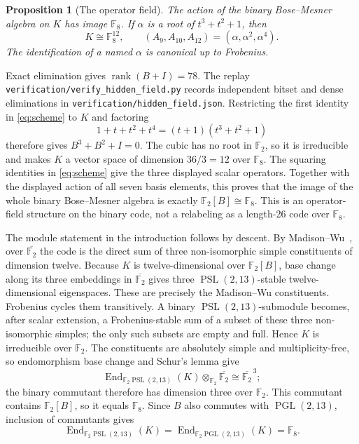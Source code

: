 \documentclass[11pt]{article}
\newtheorem{proposition}[theorem]{Proposition}
\theoremstyle{definition}
\theoremstyle{remark}
\newcommand{\F}{\mathbb F}
\begin{document}
\begin{proposition}[The operator field]
\label{prop:hidden-field}
The action of the binary Bose--Mesner algebra on \(K\) has image \(\F_8\).
If \(\alpha\) is a root of \(t^3+t^2+1\), then
\[
 K\cong\F_8^{12},\qquad
 (A_9,A_{10},A_{12})=(\alpha,\alpha^2,\alpha^4).
\]
The identification of a named \(\alpha\) is canonical up to Frobenius.
\end{proposition}

Exact elimination gives \(\operatorname{rank}(B+I)=78\).  The replay
\nolinkurl{verification/verify_hidden_field.py} records independent bitset and
dense eliminations in \nolinkurl{verification/hidden_field.json}.  Restricting
the first identity in \eqref{eq:scheme} to \(K\) and factoring
\[
 1+t+t^2+t^4=(t+1)(t^3+t^2+1)
\]
therefore gives \(B^3+B^2+I=0\).  The cubic has no root in \(\F_2\), so it
is irreducible and makes \(K\) a vector space of dimension \(36/3=12\) over
\(\F_8\).  The squaring identities in \eqref{eq:scheme} give the three
displayed scalar operators.  Together with the displayed action of all seven
basis elements, this proves that the image of the whole binary Bose--Mesner
algebra is exactly \(\F_2[B]\cong\F_8\).  This is an operator-field structure
on the binary code, not a relabeling as a length-26 code over \(\F_8\).

The module statement in the introduction follows by descent.  By
Madison--Wu~\cite[Theorem~5.1(i)]{MadisonWu2012}, over
\(\overline{\F_2}\) the code is the direct sum of three non-isomorphic simple
constituents of dimension twelve.  Because \(K\) is twelve-dimensional over
\(\F_2[B]\), base change along its three embeddings in \(\overline{\F_2}\)
gives three \(\operatorname{PSL}(2,13)\)-stable twelve-dimensional
eigenspaces.  These are precisely the Madison--Wu constituents.
Frobenius cycles them transitively.  A binary
\(\operatorname{PSL}(2,13)\)-submodule becomes, after scalar extension, a
Frobenius-stable sum of a subset of these three non-isomorphic simples; the
only such subsets are empty and full.  Hence \(K\) is irreducible over
\(\F_2\).  The constituents are absolutely simple and multiplicity-free, so
endomorphism base change and Schur's lemma give
\[
 \operatorname{End}_{\F_2\operatorname{PSL}(2,13)}(K)
 \otimes_{\F_2}\overline{\F_2}\cong\overline{\F_2}^{\,3};
\]
the binary commutant therefore has dimension three over \(\F_2\).
This commutant contains \(\F_2[B]\), so it equals \(\F_8\).  Since \(B\)
also commutes with \(\operatorname{PGL}(2,13)\), inclusion of commutants gives
\[
 \operatorname{End}_{\F_2\operatorname{PSL}(2,13)}(K)
 =\operatorname{End}_{\F_2\operatorname{PGL}(2,13)}(K)=\F_8.
\]
\end{document}

